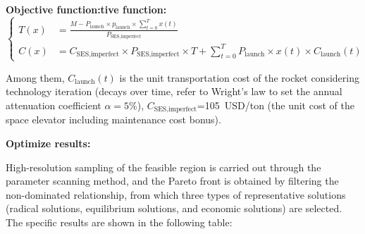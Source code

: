\noindent\textbf{Objective function:tive function:}
\[
\left\{
\begin{aligned}
T(x) &= \frac{M - P_{\text{launch}} \times p_{\text{launch}} \times \sum_{t = 0}^{T} x(t)}
             {P_{\text{SES},\text{imperfect}}} \\
C(x) &= C_{\text{SES},\text{imperfect}} \times P_{\text{SES},\text{imperfect}} \times T
       + \sum_{t = 0}^{T} P_{\text{launch}} \times x(t) \times C_{\text{launch}}(t)
\end{aligned}
\right.
\]

Among them, \(C_{\text{launch}}(t)\) is the unit transportation cost of the rocket considering technology iteration (decays over time, refer to Wright's law to set the annual attenuation coefficient $\alpha =5\%$), \(C_{\text{SES},\text{imperfect}}\)=105~USD/ton (the unit cost of the space elevator including maintenance cost bonus).

\noindent\textbf{Optimize results:}

High-resolution sampling of the feasible region is carried out through the parameter scanning method, and the Pareto front is obtained by filtering the non-dominated relationship, from which three types of representative solutions (radical solutions, equilibrium solutions, and economic solutions) are selected. The specific results are shown in the following table:

\begin{table}[htbp]
\centering
\caption{Trade-off Results of Different Transportation Strategies}
\label{tab:tradeoff_summary}

\end{table}
\FloatBarrier

